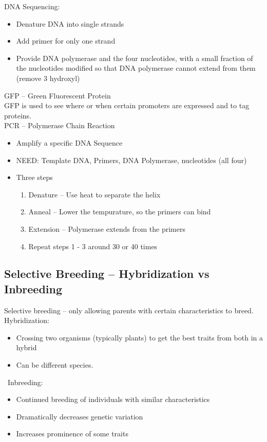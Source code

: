 \documentclass{article}
\begin{document}
DNA Sequencing:
\begin{itemize}
\item Denature DNA into single strands
\item Add primer for only one strand
\item Provide DNA polymerase and the four nucleotides, with a small fraction of the nucleotides modified so that DNA polymerase cannot extend from them (remove 3 hydroxyl)
\end{itemize}

GFP -- Green Fluorescent Protein\\
\indent GFP is used to see where or when certain promoters are expressed and to tag proteins.\\

PCR -- Polymerase Chain Reaction\\
\begin{itemize}
\item Amplify a specific DNA Sequence
\item NEED: Template DNA, Primers, DNA Polymerase, nucleotides (all four)
\item Three steps
\begin{enumerate}
\item Denature -- Use heat to separate the helix
\item Anneal -- Lower the tempurature, so the primers can bind
\item Extension -- Polymerase extends from the primers
\item Repeat steps 1 - 3 around 30 or 40 times
\end{enumerate}

\end{itemize}


\subsection{Selective Breeding -- Hybridization vs Inbreeding}

Selective breeding -- only allowing parents with certain characteristics to breed.\\
Hybridization:
\begin{itemize}
\item Crossing two organisms (typically plants) to get the best traits from both in a hybrid
\item Can be different species.
\end{itemize}\
Inbreeding:
\begin{itemize}
\item Continued breeding of individuals with similar characteristics
\item Dramatically decreases genetic variation
\item Increases prominence of some traits
\end{itemize}
\end{document}
